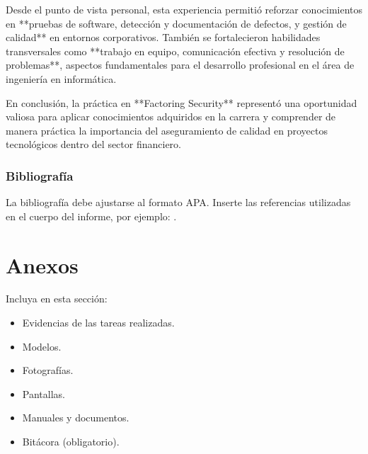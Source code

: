\documentclass[12pt,a4paper]{report}
\begin{document}
Desde el punto de vista personal, esta experiencia permitió reforzar conocimientos en **pruebas de software, detección y documentación de defectos, y gestión de calidad** en entornos corporativos. También se fortalecieron habilidades transversales como **trabajo en equipo, comunicación efectiva y resolución de problemas**, aspectos fundamentales para el desarrollo profesional en el área de ingeniería en informática.

En conclusión, la práctica en **Factoring Security** representó una oportunidad valiosa para aplicar conocimientos adquiridos en la carrera y comprender de manera práctica la importancia del aseguramiento de calidad en proyectos tecnológicos dentro del sector financiero.


\bigskip

\subsection{Bibliografía}
La bibliografía debe ajustarse al formato APA. Inserte las referencias utilizadas en el cuerpo del informe, por ejemplo: \cite{ejemploReferencia}.

\chapter{Anexos}
Incluya en esta sección:
\begin{itemize}
    \item Evidencias de las tareas realizadas.
    \item Modelos.
    \item Fotografías.
    \item Pantallas.
    \item Manuales y documentos.
    \item Bitácora (obligatorio).
\end{itemize}

\cleardoublepage
{}

\end{document}
